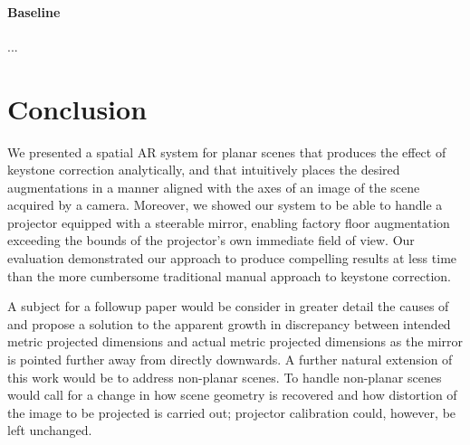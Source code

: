 \documentclass[review]{elsarticle}
\begin{document}
\paragraph{Baseline} ...

\section{Conclusion}

We presented a spatial AR system for planar scenes that produces the effect of keystone correction analytically, and that intuitively places the desired augmentations in a manner aligned with the axes of an image of the scene acquired by a camera. Moreover, we showed our system to be able to handle a projector equipped with a steerable mirror, enabling factory floor augmentation exceeding the bounds of the projector's own immediate field of view. Our evaluation demonstrated our approach to produce compelling results at less time than the more cumbersome traditional manual approach to keystone correction.

A subject for a followup paper would be consider in greater detail the causes of and propose a solution to the apparent growth in discrepancy between intended metric projected dimensions and actual metric projected dimensions as the mirror is pointed further away from directly downwards. A further natural extension of this work would be to address non-planar scenes. To handle non-planar scenes would call for a change in how scene geometry is recovered and how distortion of the image to be projected is carried out; projector calibration could, however, be left unchanged.


\end{document}
